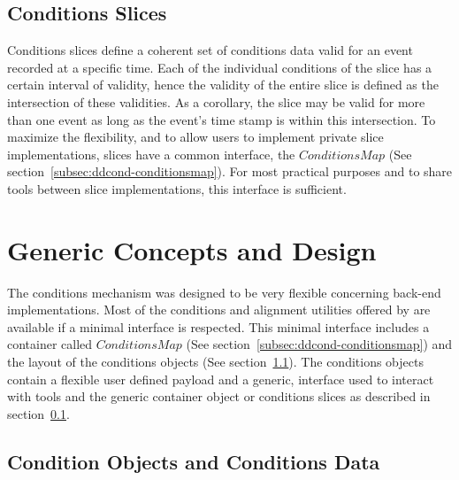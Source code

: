 \documentclass[10pt,a4paper]{article}
\begin{document}
\subsection{Conditions Slices}
\label{subsec:ddcond-conditions-slices}

\noindent
Conditions slices define a coherent set of conditions data valid for an event 
recorded at a specific time. Each of the individual conditions of the slice
has a certain interval of validity, hence the validity of the entire slice
is defined as the intersection of these validities.
As a corollary, the slice may be valid for more than one event as long as the
event's time stamp is within this intersection. To maximize the flexibility,
and to allow users to implement private slice implementations, slices have 
a common interface, the $ConditionsMap$ (See section~\ref{subsec:ddcond-conditionsmap}). 
For most practical purposes and to share tools between slice implementations, 
this interface is sufficient.

\section{Generic Concepts and Design}
\label{sec:ddcond-design-concepts}

\noindent 
The \DDH conditions mechanism was designed to be very flexible concerning 
back-end implementations. Most of the conditions and alignment utilities offered 
by \DDH are available if a minimal interface is respected. This minimal interface
includes a container called $ConditionsMap$ (See section~\ref{subsec:ddcond-conditionsmap})
and the layout of the conditions objects (See section~\ref{subsec:ddcond-conditions-data}).
The conditions objects contain a flexible user defined payload and a generic, 
interface used to interact with tools and the generic container object or
conditions slices as described in section~\ref{subsec:ddcond-conditions-slices}.

\subsection{Condition Objects and Conditions Data}
\label{subsec:ddcond-conditions-data}
\end{document}
